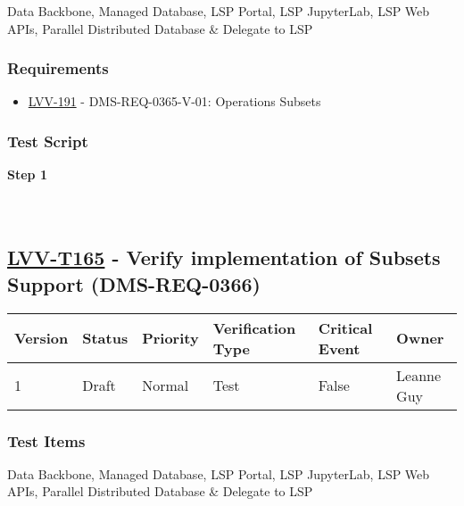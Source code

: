 Data Backbone, Managed Database, LSP Portal, LSP JupyterLab, LSP Web
APIs, Parallel Distributed Database \& Delegate to LSP

\hypertarget{requirements-141}{%
\subsubsection{Requirements}\label{requirements-141}}

\begin{itemize}
\tightlist
\item
  \href{https://jira.lsstcorp.org/browse/LVV-191}{LVV-191} -
  DMS-REQ-0365-V-01: Operations Subsets
\end{itemize}

\hypertarget{test-script-141}{%
\subsubsection{Test Script}\label{test-script-141}}

\textbf{Step 1}\\
~\\
~\\

\hypertarget{lvv-t165---verify-implementation-of-subsets-support-dms-req-0366}{%
\subsection{\texorpdfstring{\href{https://jira.lsstcorp.org/secure/Tests.jspa\#/testCase/LVV-T165}{LVV-T165}
- Verify implementation of Subsets Support
(DMS-REQ-0366)}{LVV-T165 - Verify implementation of Subsets Support (DMS-REQ-0366)}}\label{lvv-t165---verify-implementation-of-subsets-support-dms-req-0366}}

\begin{longtable}[]{@{}llllll@{}}
\toprule
Version & Status & Priority & Verification Type & Critical Event &
Owner\tabularnewline
\midrule
\endhead
1 & Draft & Normal & Test & False & Leanne Guy\tabularnewline
\bottomrule
\end{longtable}

\hypertarget{test-items-141}{%
\subsubsection{Test Items}\label{test-items-141}}

Data Backbone, Managed Database, LSP Portal, LSP JupyterLab, LSP Web
APIs, Parallel Distributed Database \& Delegate to LSP

